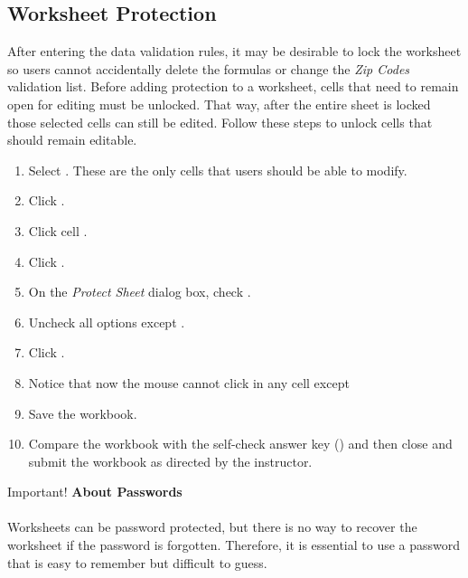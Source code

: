 \subsection{Worksheet Protection}

After entering the data validation rules, it may be desirable to lock the  worksheet so users cannot accidentally delete the formulas or change the \textit{Zip Codes} validation list. Before adding protection to a worksheet, cells that need to remain open for editing must be unlocked. That way, after the entire sheet is locked those selected cells can still be edited. Follow these steps to unlock cells that should remain editable. 

\begin{enumerate}
	\item Select . These are the only cells that users should be able to modify.
	\item Click .
	\item Click cell .
	\item Click .
	\item On the \textit{Protect Sheet} dialog box, check .
	\item Uncheck all options except .
	\item Click .
	\item Notice that now the mouse cannot click in any cell except 
	\item Save the  workbook.
	\item Compare the workbook with the self-check answer key () and then close and submit the  workbook as directed by the instructor.
\end{enumerate}

\begin{center}
	\begin{infobox}{Important!}
		\textbf{About Passwords}
		\\
		\\
		Worksheets can be password protected, but there is no way to recover the worksheet if the password is forgotten. Therefore, it is essential to use a password that is easy to remember but difficult to guess.
	\end{infobox}
\end{center}

